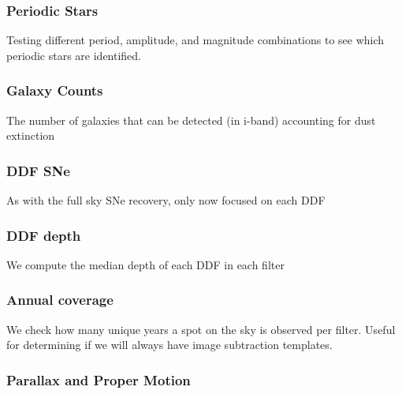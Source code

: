 \subsubsection{Periodic Stars}

Testing different period, amplitude, and magnitude combinations to see which periodic stars are identified.


\subsubsection{Galaxy Counts}

The number of galaxies that can be detected (in i-band) accounting for dust extinction


\subsubsection{DDF SNe}

As with the full sky SNe recovery, only now focused on each DDF


\subsubsection{DDF depth}

We compute the median depth of each DDF in each filter


\subsubsection{Annual coverage}

We check how many unique years a spot on the sky is observed per filter. Useful for determining if we will always have image subtraction templates.


\subsubsection{Parallax and Proper Motion}

